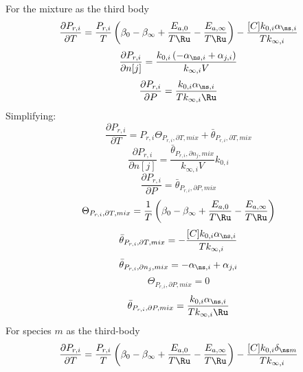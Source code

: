 \documentclass[a4paper,10pt]{article}
\begin{document}
For the mixture as the third body
\begin{dmath} \frac{\partial P_{r, i} }{\partial T } = \frac{P_{r, i}}{T} \left(\beta_{0} - \beta_{\infty} + \frac{E_{a, 0}}{T \Ru} - \frac{E_{a, \infty}}{T \Ru}\right) - \frac{[C] k_{0, i} \alpha_{\ns,i}}{T k_{\infty, i}}\end{dmath} 
\begin{dmath} \frac{\partial P_{r, i} }{\partial n[j] } = \frac{k_{0, i} \left(- \alpha_{\ns,i} + \alpha_{j,i}\right)}{k_{\infty, i} V}\end{dmath} 
\begin{dmath} \frac{\partial P_{r, i} }{\partial P } = \frac{k_{0, i} \alpha_{\ns,i}}{T k_{\infty, i} \Ru}\end{dmath} 
Simplifying:
\begin{dmath} \frac{\partial P_{r, i} }{\partial T } = P_{r, i} \Theta_{P_{r,i}, \partial T, mix} + \bar{\theta}_{P_{r, i}, \partial T, mix}\end{dmath} 
\begin{dmath} \frac{\partial P_{r, i} }{\partial n[j] } = \frac{\bar{\theta}_{P_{r, i}, \partial n_j, mix}}{k_{\infty, i} V} k_{0, i}\end{dmath} 
\begin{dmath} \frac{\partial P_{r, i} }{\partial P } = \bar{\theta}_{P_{r, i}, \partial P, mix}\end{dmath} 
\begin{dmath} \Theta_{P_{r,i}, \partial T, mix} = \frac{1}{T} \left(\beta_{0} - \beta_{\infty} + \frac{E_{a, 0}}{T \Ru} - \frac{E_{a, \infty}}{T \Ru}\right)\end{dmath} 
\begin{dmath} \bar{\theta}_{P_{r, i}, \partial T, mix} = - \frac{[C] k_{0, i} \alpha_{\ns,i}}{T k_{\infty, i}}\end{dmath} 
\begin{dmath} \bar{\theta}_{P_{r, i}, \partial n_j, mix} = - \alpha_{\ns,i} + \alpha_{j,i}\end{dmath} 
\begin{dmath} \Theta_{P_{r,i}, \partial P, mix} = 0\end{dmath} 
\begin{dmath} \bar{\theta}_{P_{r, i}, \partial P, mix} = \frac{k_{0, i} \alpha_{\ns,i}}{T k_{\infty, i} \Ru}\end{dmath} 
For species $m$ as the third-body
\begin{dmath} \frac{\partial P_{r, i} }{\partial T } = \frac{P_{r, i}}{T} \left(\beta_{0} - \beta_{\infty} + \frac{E_{a, 0}}{T \Ru} - \frac{E_{a, \infty}}{T \Ru}\right) - \frac{[C] k_{0, i} \delta_{\ns m}}{T k_{\infty, i}}\end{dmath} 
\end{document}
